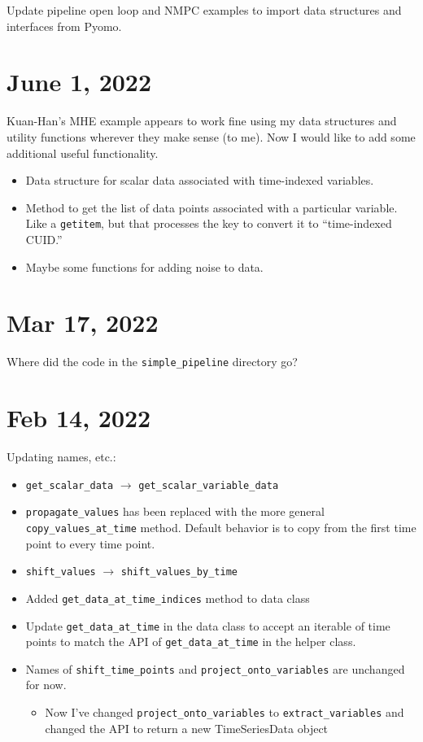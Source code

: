 \documentclass{article}
\begin{document}
Update pipeline open loop and NMPC examples to import data structures
and interfaces from Pyomo.

\section{June 1, 2022}

Kuan-Han's MHE example appears to work fine using my data structures
and utility functions wherever they make sense (to me).
Now I would like to add some additional useful functionality.
\begin{itemize}
  \item Data structure for scalar data associated with time-indexed variables.
  \item Method to get the list of data points associated with a particular
    variable. Like a \texttt{getitem}, but that processes the key to convert
    it to ``time-indexed CUID.''
  \item Maybe some functions for adding noise to data.
\end{itemize}

\section{Mar 17, 2022}

Where did the code in the \texttt{simple\_pipeline} directory go?

\section{Feb 14, 2022}

Updating names, etc.:
\begin{itemize}
  \item \texttt{get\_scalar\_data} $\rightarrow$
    \texttt{get\_scalar\_variable\_data}
  \item \texttt{propagate\_values} has been replaced with the more
    general \texttt{copy\_values\_at\_time} method.
    Default behavior is to copy from the first time point to every
    time point.
  \item \texttt{shift\_values} $\rightarrow$
    \texttt{shift\_values\_by\_time}
  \item Added \texttt{get\_data\_at\_time\_indices} method to data class
  \item Update \texttt{get\_data\_at\_time} in the data class to accept
    an iterable of time points to match the API of \texttt{get\_data\_at\_time}
    in the helper class.
  \item Names of \texttt{shift\_time\_points} and
    \texttt{project\_onto\_variables} are unchanged for now.
    \begin{itemize}
      \item Now I've changed \texttt{project\_onto\_variables} to
	\texttt{extract\_variables} and changed the API to return a new
	TimeSeriesData object
    \end{itemize}
\end{itemize}
\end{document}
